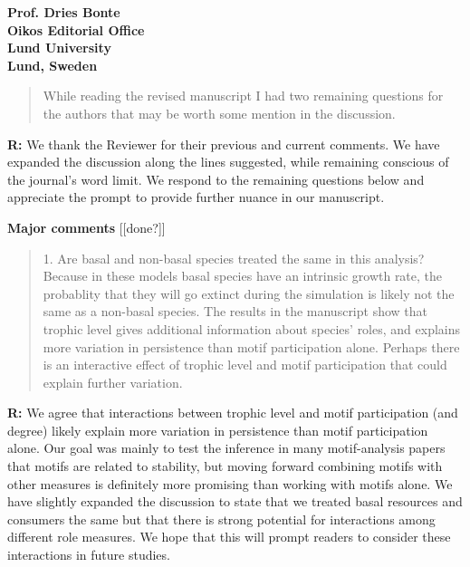 \documentclass[12pt]{letter}
\begin{document}
\begin{letter}{\bf Prof. Dries Bonte\\
Oikos Editorial Office \\
Lund University \\
Lund, Sweden}
\begin{quotation}
    While reading the revised manuscript I had two remaining questions for the authors that may be worth some mention in the discussion. 

  \end{quotation}

  \smallskip

  \textbf{R:} We thank the Reviewer for their previous and current comments. We have expanded the discussion along the lines suggested, while remaining conscious of the journal's word limit. We respond to the remaining questions below and appreciate the prompt to provide further nuance in our manuscript.

  \smallskip

  \textbf{Major comments} [[done?]]

    \begin{quotation}
      1. Are basal and non-basal species treated the same in this analysis? Because in these models basal species have an intrinsic growth rate, the probablity that they will go extinct during the simulation is likely not the same as a non-basal species. The results in the manuscript show that trophic level gives additional information about species' roles, and explains more variation in persistence than motif participation alone. Perhaps there is an interactive effect of trophic level and motif participation that could explain further variation.
    \end{quotation}

    \smallskip

    \textbf{R:} We agree that interactions between trophic level and motif participation (and degree) likely explain more variation in persistence than motif participation alone. Our goal was mainly to test the inference in many motif-analysis papers that motifs are related to stability, but moving forward combining motifs with other measures is definitely more promising than working with motifs alone. We have slightly expanded the discussion to state that we treated basal resources and consumers the same but that there is strong potential for interactions among different role measures. We hope that this will prompt readers to consider these interactions in future studies.



\end{letter}
\end{document}
